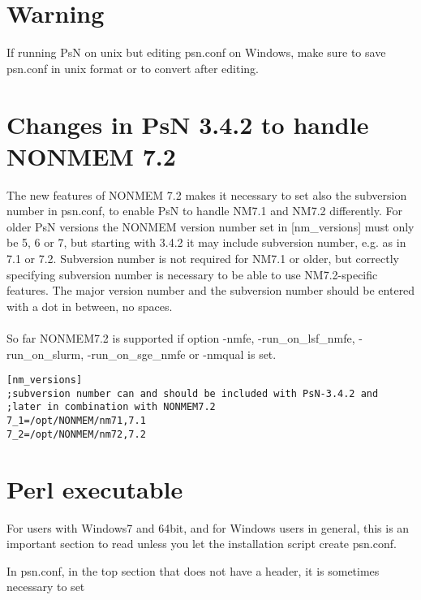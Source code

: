 \documentclass[a4paper,12pt]{article}
\begin{document}
\section{Warning}
If running PsN on unix but editing psn.conf on Windows, make sure to save psn.conf in unix format or to convert after editing.

\section{Changes in PsN 3.4.2 to handle NONMEM 7.2}
The new features of NONMEM 7.2 makes it necessary to set also the subversion number in psn.conf, to enable PsN to handle NM7.1 and NM7.2 differently. For older PsN versions the NONMEM version  number set in [nm\_versions] must only be 5, 6 or 7, but starting with 3.4.2 it may include subversion number, e.g. as in 7.1 or 7.2. Subversion number is not required for NM7.1 or older, but correctly specifying subversion number is necessary to be able to use NM7.2-specific features. The major version number and the subversion number should be entered with a dot in between, no spaces.  
\\
\\
So far NONMEM7.2 is supported if option -nmfe, -run\_on\_lsf\_nmfe, -run\_on\_slurm, -run\_on\_sge\_nmfe or -nmqual is set. 
\begin{verbatim}
[nm_versions]
;subversion number can and should be included with PsN-3.4.2 and
;later in combination with NONMEM7.2 
7_1=/opt/NONMEM/nm71,7.1
7_2=/opt/NONMEM/nm72,7.2
\end{verbatim}


\section{Perl executable}


For users with Windows7 and 64bit, and for Windows users in general, this is an important section to read unless you let the installation script create psn.conf.

In psn.conf, in the top section that does not have a header, it is sometimes necessary to set
\end{document}
